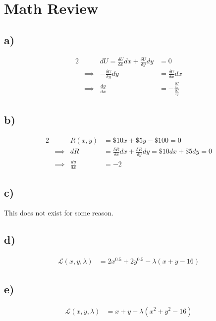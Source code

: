 \documentclass[12pt,letterpaper]{article}
\theoremstyle{definition}
\begin{document}
\section*{Math Review}
\subsection*{a)}

\begin{alignat*}{2}
    && dU = \frac{\delta U}{\delta x}dx + \frac{\delta U}{\delta y}dy &= 0 \\
    &\implies& -\frac{\delta U}{\delta y}dy &= \frac{\delta U}{\delta x}dx \\
    &\implies& \frac{dy}{dx} &= -\frac{\frac{\delta U}{\delta x}}{\frac{\delta U}{\delta y}}
\end{alignat*}

\subsection*{b)}

\begin{alignat*}{2}
    && R(x,y) &= \$10x + \$5y - \$100 = 0 \\
    &\implies& dR &= \frac{\delta R}{\delta x}dx + \frac{\delta R}{\delta y}dy = \$10dx + \$5dy = 0 \\
    &\implies& \frac{dy}{dx} &= -2
\end{alignat*}

\subsection*{c)}

This does not exist for some reason.

\subsection*{d)}
\begin{align*}
    \mathcal{L}(x, y, \lambda) &= 2x^{0.5} + 2y^{0.5} -\lambda(x + y - 16) 
\end{align*}

\subsection*{e)}
\begin{align*}
    \mathcal{L}(x, y, \lambda) &= x + y - \lambda(x^2 + y^2 - 16) 
\end{align*}
\end{document}
